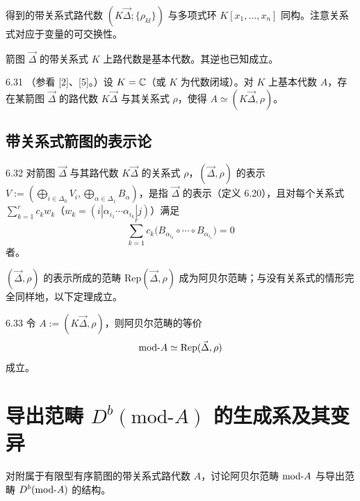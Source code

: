 得到的带关系式路代数 $(K\vec{\Delta};\{\rho_{kl}\})$ 与多项式环 $K[x_1,\dots,x_n]$ 同构。注意关系式对应于变量的可交换性。

箭图 $\vec{\Delta}$ 的带关系式 $K$ 上路代数是基本代数。其逆也已知成立。

\begin{theorem}{6.31}
（参看 [2]、[5]。）设 $K=\mathbb{C}$（或 $K$ 为代数闭域）。对 $K$ 上基本代数 $A$，存在某箭图 $\vec{\Delta}$ 的路代数 $K\vec{\Delta}$ 与其关系式 $\rho$，使得 $A\simeq(K\vec{\Delta},\rho)$。
\end{theorem}

\subsection{带关系式箭图的表示论}

\begin{definition}{6.32}
对箭图 $\vec{\Delta}$ 与其路代数 $K\vec{\Delta}$ 的关系式 $\rho$，$(\vec{\Delta},\rho)$ 的表示 $V:=(\bigoplus_{i\in\Delta_0}V_i,\bigoplus_{\alpha\in\Delta_1}B_\alpha)$，是指 $\vec{\Delta}$ 的表示（定义 6.20），且对每个关系式 $\sum_{k=1}^{r}c_kw_k$（$w_k=(i|\alpha_{i_1}\cdots\alpha_{i_k}|j)$）满足
\[
\sum_{k=1}^{r}c_k\bigl(B_{\alpha_{i_k}}\circ\cdots\circ B_{\alpha_{i_1}}\bigr)=0
\]
者。
\end{definition}


$(\vec{\Delta},\rho)$ 的表示所成的范畴 $\mathrm{Rep}(\vec{\Delta},\rho)$ 成为阿贝尔范畴；与没有关系式的情形完全同样地，以下定理成立。

\begin{theorem}{6.33}
令 $A:=(K\vec{\Delta},\rho)$，则阿贝尔范畴的等价
\[
\mathrm{mod}\text{-}A\simeq\mathrm{Rep}(\vec{\Delta},\rho)
\]
成立。
\end{theorem}

\section{导出范畴 $D^{b}(\mathrm{mod}\text{-}A)$ 的生成系及其变异}

对附属于有限型有序箭图的带关系式路代数 $A$，讨论阿贝尔范畴 $\mathrm{mod}\text{-}A$ 与导出范畴 $D^{b}(\mathrm{mod}\text{-}A)$ 的结构。

